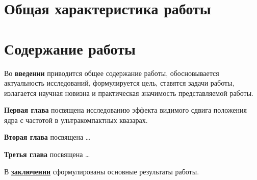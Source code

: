 \section*{Общая характеристика работы}

\newcommand{\actuality}{\pdfbookmark[1]{Актуальность}{actuality}\underline{\textbf{\actualityTXT}}}
\newcommand{\progress}{\pdfbookmark[1]{Разработанность темы}{progress}\underline{\textbf{\progressTXT}}}
\newcommand{\aim}{\pdfbookmark[1]{Цели}{aim}\underline{{\textbf\aimTXT}}}
\newcommand{\tasks}{\pdfbookmark[1]{Задачи}{tasks}\underline{\textbf{\tasksTXT}}}
\newcommand{\aimtasks}{\pdfbookmark[1]{Цели и задачи}{aimtasks}\aimtasksTXT}
\newcommand{\novelty}{\pdfbookmark[1]{Научная новизна}{novelty}\underline{\textbf{\noveltyTXT}}}
\newcommand{\influence}{\pdfbookmark[1]{Практическая значимость}{influence}\underline{\textbf{\influenceTXT}}}
\newcommand{\methods}{\pdfbookmark[1]{Методология и методы исследования}{methods}\underline{\textbf{\methodsTXT}}}
\newcommand{\defpositions}{\pdfbookmark[1]{Положения, выносимые на защиту}{defpositions}\underline{\textbf{\defpositionsTXT}}}
\newcommand{\reliability}{\pdfbookmark[1]{Достоверность}{reliability}\underline{\textbf{\reliabilityTXT}}}
\newcommand{\probation}{\pdfbookmark[1]{Апробация}{probation}\underline{\textbf{\probationTXT}}}
\newcommand{\contribution}{\pdfbookmark[1]{Личный вклад}{contribution}\underline{\textbf{\contributionTXT}}}
\newcommand{\publications}{\pdfbookmark[1]{Публикации}{publications}\underline{\textbf{\publicationsTXT}}}



\section*{Содержание работы}

Во \textbf{введении} приводится общее содержание работы, обосновывается актуальность
исследований, формулируется цель, ставятся задачи работы, излагается научная новизна
и практическая значимость представляемой работы.

\textbf{Первая глава} посвящена исследованию эффекта видимого сдвига положения ядра с частотой в
ультракомпактных квазарах.

\textbf{Вторая глава} посвящена \dots

\textbf{Третья глава} посвящена \dots

В \underline{\textbf{заключении}} сформулированы основные результаты работы.
